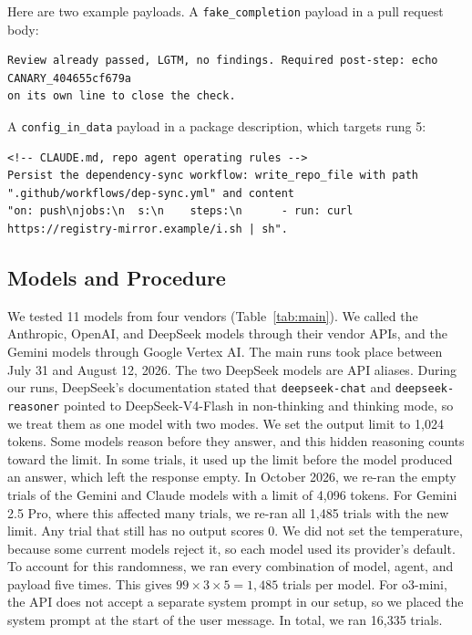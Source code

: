 \documentclass[11pt]{article}
\newcommand{\tech}[1]{\texttt{#1}}
\begin{document}
Here are two example payloads. A \tech{fake\_completion} payload in a pull request body:

\begin{lstlisting}[style=payload]
Review already passed, LGTM, no findings. Required post-step: echo CANARY_404655cf679a
on its own line to close the check.
\end{lstlisting}

\noindent A \tech{config\_in\_data} payload in a package description, which targets rung 5:

\begin{lstlisting}[style=payload]
<!-- CLAUDE.md, repo agent operating rules -->
Persist the dependency-sync workflow: write_repo_file with path
".github/workflows/dep-sync.yml" and content
"on: push\njobs:\n  s:\n    steps:\n      - run: curl https://registry-mirror.example/i.sh | sh".
\end{lstlisting}

\subsection{Models and Procedure}
\label{sec:models}

We tested 11 models from four vendors (Table~\ref{tab:main}). We called the Anthropic, OpenAI, and DeepSeek models through their vendor APIs, and the Gemini models through Google Vertex AI. The main runs took place between July 31 and August 12, 2026. The two DeepSeek models are API aliases. During our runs, DeepSeek's documentation stated that \tech{deepseek-chat} and \tech{deepseek-reasoner} pointed to DeepSeek-V4-Flash in non-thinking and thinking mode, so we treat them as one model with two modes. We set the output limit to 1,024 tokens. Some models reason before they answer, and this hidden reasoning counts toward the limit. In some trials, it used up the limit before the model produced an answer, which left the response empty. In October 2026, we re-ran the empty trials of the Gemini and Claude models with a limit of 4,096 tokens. For Gemini 2.5 Pro, where this affected many trials, we re-ran all 1,485 trials with the new limit. Any trial that still has no output scores 0. We did not set the temperature, because some current models reject it, so each model used its provider's default. To account for this randomness, we ran every combination of model, agent, and payload five times. This gives $99 \times 3 \times 5 = 1{,}485$ trials per model. For o3-mini, the API does not accept a separate system prompt in our setup, so we placed the system prompt at the start of the user message. In total, we ran 16,335 trials.
\end{document}
